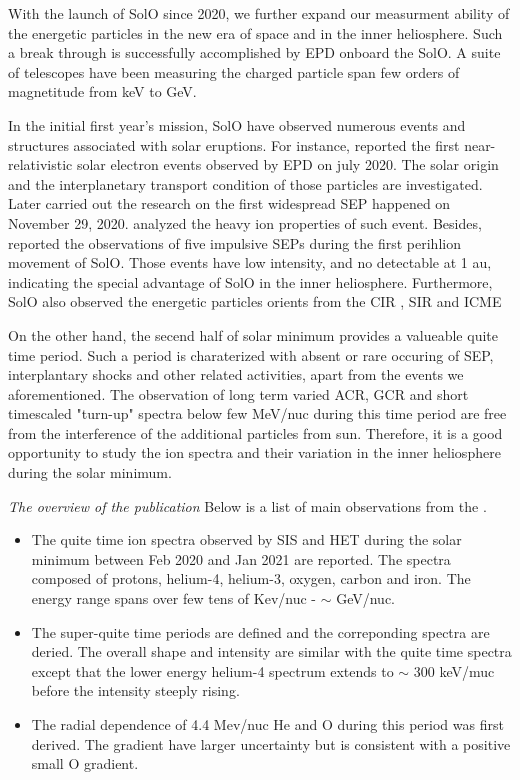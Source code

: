 
With the launch of \ac{SolO} since 2020, we further expand our measurment ability of the energetic particles in the new era of space and in the inner heliosphere. Such a break through is successfully accomplished by \ac{EPD} onboard the \ac{SolO}. A suite of telescopes have been measuring the charged particle span few orders of magnetitude from keV to GeV.

In the initial first year's mission, \ac{SolO} have observed numerous events and structures associated with solar eruptions. For instance, \citet{Gomez20201AA} reported the first near-relativistic solar electron events observed by \ac{EPD} on july 2020. The solar origin and the interplanetary transport condition of those particles are investigated. Later \citet{Kolhoff2021AA} carried out the research on the first widespread \ac{SEP} happened on November 29, 2020. \citet{Mason2021AA} analyzed the heavy ion properties of such event. Besides, \citet{Mason2021AA_he3rich} reported the observations of five impulsive \acp{SEP} during the first perihlion movement of \ac{SolO}. Those events have low intensity, and no detectable at 1 au, indicating the special advantage of \ac{SolO} in the inner heliosphere. Furthermore, \ac{SolO} also observed the energetic particles orients from the \ac{CIR} \citep{Allen2021AA_suprathermal}, \ac{SIR} \cite{Aran2021AA} and \ac{ICME} \citep{Kilpua2021AA}


On the other hand, the secend half of solar minimum provides a valueable quite time period. Such a period is charaterized with absent or rare occuring of \ac{SEP}, interplantary shocks and other related activities, apart from the events we aforementioned. The observation of long term varied \ac{ACR}, \ac{GCR} and short timescaled "turn-up" spectra below few MeV/nuc during this time period are free from the interference of the additional particles from sun. Therefore, it is a good opportunity to study the ion spectra and their variation in the inner heliosphere during the solar minimum.

\textit{The overview of the publication}
Below is a list of main observations from the \citep{Mason-2021-SolOQuietTime}.

\begin{itemize}
    \item The quite time ion spectra observed by SIS and HET during the solar minimum between Feb 2020 and Jan 2021 are reported. The spectra composed of protons, helium-4, helium-3, oxygen, carbon and iron. The energy range spans over few tens of Kev/nuc - $\sim$ GeV/nuc.
    \item The super-quite time periods are defined and the correponding spectra are deried. The overall shape and intensity are similar with the quite time spectra except that the lower energy helium-4 spectrum extends to $\sim$ 300 keV/muc before the intensity steeply rising.
    \item The radial dependence of 4.4 Mev/nuc He and O during this period was first derived. The gradient have larger uncertainty but is consistent with a positive small O gradient.
\end{itemize}
